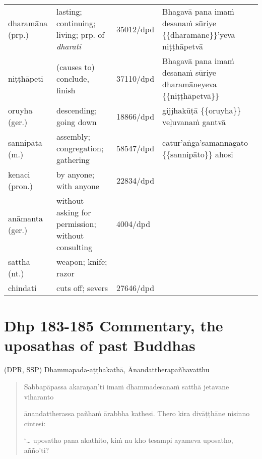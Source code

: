 \documentclass[11pt,oneside]{memoir}
\begin{document}
\begin{longtable}{L{\colOne} L{\colTwo} H H}
dharamāna (prp.) & lasting; continuing; living; prp. of \emph{dharati} & 35012/dpd & Bhagavā pana imaṁ desanaṁ sūriye \{\{dharamāne\}\}'yeva niṭṭhāpetvā\\[0pt]
niṭṭhāpeti & (causes to) conclude, finish & 37110/dpd & Bhagavā pana imaṁ desanaṁ sūriye dharamāneyeva \{\{niṭṭhāpetvā\}\}\\[0pt]
oruyha (ger.) & descending; going down & 18866/dpd & gijjhakūṭā \{\{oruyha\}\} veḷuvanaṁ gantvā\\[0pt]
sannipāta (m.) & assembly; congregation; gathering & 58547/dpd & catur'aṅga'samannāgato \{\{sannipāto\}\} ahosi\\[0pt]
kenaci (pron.) & by anyone; with anyone & 22834/dpd & \\[0pt]
anāmanta (ger.) & without asking for permission; without consulting & 4004/dpd & \\[0pt]
sattha (nt.) & weapon; knife; razor &  & \\[0pt]
chindati & cuts off; severs & 27646/dpd & \\[0pt]
\end{longtable}

\section{Dhp 183-185 Commentary, the uposathas of past Buddhas}
\label{sec:org2e02aef}
(\href{https://www.digitalpalireader.online/\_dprhtml/index.html?loc=k.1.0.1.5.3.0.a}{DPR}, \href{http://localhost:4848/suttas/s0502a.att/pli/cst4?quote=m\%25C4\%2581t\%25C4\%2581pitaro\%2520\%25C4\%2581yuparicchedo\%2520bodhi\%2520s\%25C4\%2581vakasannip\%25C4\%2581to\&window\_type=Sutta+Study}{SSP}) Dhammapada-aṭṭhakathā, Ānandattherapañhavatthu

\vspace*{-\baselineskip}
\enlargethispage*{2\baselineskip}

\begin{quote}
Sabbapāpassa akaraṇan'ti imaṁ dhammadesanaṁ satthā jetavane viharanto

ānandattherassa pañhaṁ ārabbha kathesi. Thero kira divāṭṭhāne nisinno cintesi:

`\ldots{} uposatho pana akathito, kiṁ nu kho tesampi ayameva uposatho, añño'ti?
\end{quote}

\vspace*{-0.5\baselineskip}
\end{document}
